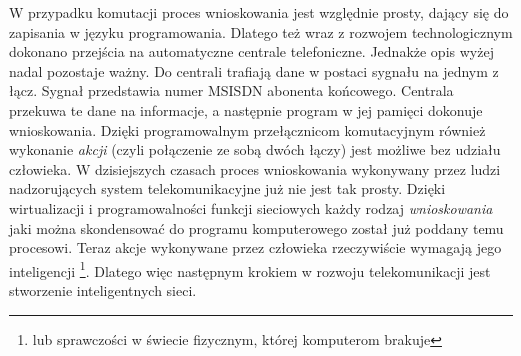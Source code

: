 W przypadku komutacji proces wnioskowania jest względnie prosty, dający się do zapisania w języku programowania. Dlatego też wraz z rozwojem technologicznym dokonano przejścia na automatyczne centrale telefoniczne. Jednakże opis wyżej nadal pozostaje ważny. Do centrali trafiają dane w postaci sygnału na jednym z łącz. Sygnał przedstawia numer MSISDN abonenta końcowego. Centrala przekuwa te dane na informacje, a następnie program w jej pamięci dokonuje wnioskowania. Dzięki programowalnym przełącznicom komutacyjnym również wykonanie \textit{akcji} (czyli połączenie ze sobą dwóch łączy) jest możliwe bez udziału człowieka. W dzisiejszych czasach proces wnioskowania wykonywany przez ludzi nadzorujących system telekomunikacyjne już nie jest tak prosty. Dzięki wirtualizacji i programowalności funkcji sieciowych każdy rodzaj \textit{wnioskowania} jaki można skondensować do programu komputerowego został już poddany temu procesowi. Teraz akcje wykonywane przez człowieka rzeczywiście wymagają jego inteligencji \footnote{lub sprawczości w świecie fizycznym, której komputerom brakuje}. Dlatego więc następnym krokiem w rozwoju telekomunikacji jest stworzenie inteligentnych sieci. 